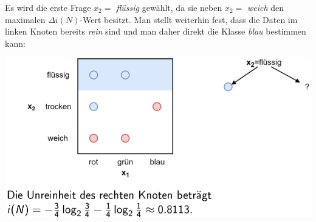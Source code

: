 \documentclass{report}
\begin{document}
  Es wird die erste Frage $x_2 = $ \textit{flüssig} gewählt, da sie neben $x_2 = $ \textit{weich} den maximalen	
  $\Delta i(N)$-Wert besitzt. Man stellt weiterhin fest, dass die Daten im linken Knoten bereits \textit{rein}	
  sind und man daher direkt die Klasse \textit{blau} bestimmen kann:	
  
  \begin{center}	
    \includegraphics[scale=.3]{ml07_14}	
  \end{center}	
  
\end{document}

